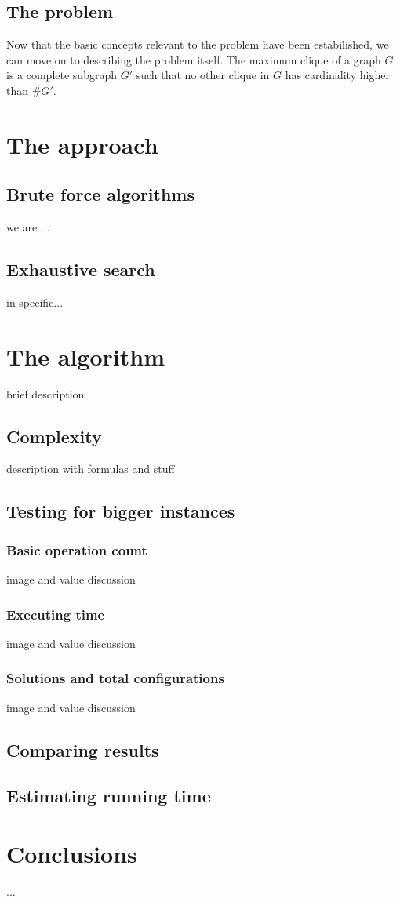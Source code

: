 \documentclass[...]{revdetua}
\begin{document}
\subsection{The problem}
Now that the basic concepts relevant to the problem have been estabilished, we can move on to describing the problem itself.
The maximum clique of a graph $G$ is a complete subgraph $G'$ such that no other clique in 
$G$ has cardinality higher than $\#G'$.
\section{The approach}
\subsection{Brute force algorithms}
we are ...
\subsection{Exhaustive search}
in specific...

\section{The algorithm}
brief description
\subsection{Complexity}
description with formulas and stuff
\subsection{Testing for bigger instances}
\subsubsection{Basic operation count}
image and value discussion
\subsubsection{Executing time}
image and value discussion
\subsubsection{Solutions and total configurations}
image and value discussion
\subsection{Comparing results}
\subsection{Estimating running time}
\section{Conclusions}

\begin{keywords}%
  ...
\end{keywords}


\end{document}
